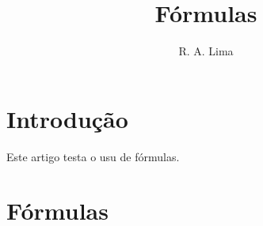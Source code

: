 \documentclass[2columns,12pt]{article}
\title{Fórmulas}
\author{R. A. Lima}
\begin{document}
	\maketitle

	\section{Introdução}
		Este artigo testa o usu de fórmulas.
	\section{Fórmulas}
\end{document}
